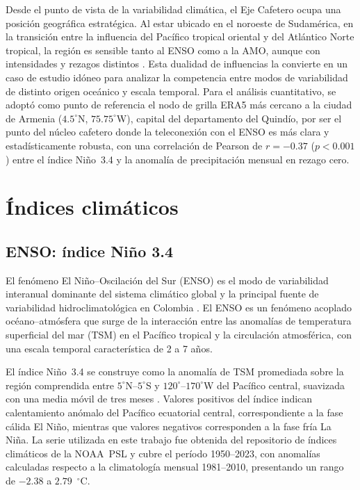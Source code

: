 \documentclass[12pt, a4paper]{article}
\begin{document}
Desde el punto de vista de la variabilidad climática, el Eje Cafetero ocupa una
posición geográfica estratégica. Al estar ubicado en el noroeste de Sudamérica,
en la transición entre la influencia del Pacífico tropical oriental y del Atlántico
Norte tropical, la región es sensible tanto al ENSO como a la AMO, aunque con
intensidades y rezagos distintos \citep{Canchala2020}. Esta dualidad de influencias
la convierte en un caso de estudio idóneo para analizar la competencia entre modos
de variabilidad de distinto origen oceánico y escala temporal. Para el análisis cuantitativo, se adoptó como punto de referencia el nodo de grilla
ERA5 más cercano a la ciudad de Armenia ($4.5^\circ$N, $75.75^\circ$W), capital del
departamento del Quindío, por ser el punto del núcleo cafetero donde la teleconexión
con el ENSO es más clara y estadísticamente robusta, con una correlación de Pearson
de $r = -0.37$ ($p < 0.001$) entre el índice Niño~3.4 y la anomalía de precipitación
mensual en rezago cero.

\section{Índices climáticos}

\subsection{ENSO: índice Niño 3.4}

El fenómeno El Niño--Oscilación del Sur (ENSO) es el modo de variabilidad
interanual dominante del sistema climático global y la principal fuente de
variabilidad hidroclimatológica en Colombia \citep{Poveda1997, Poveda2011}.
El ENSO es un fenómeno acoplado océano--atmósfera que surge de la interacción
entre las anomalías de temperatura superficial del mar (TSM) en el Pacífico
tropical y la circulación atmosférica, con una escala temporal característica
de 2 a 7 años.

El índice Niño~3.4 se construye como la anomalía de TSM promediada sobre la
región comprendida entre $5^\circ$N--$5^\circ$S y $120^\circ$--$170^\circ$W
del Pacífico central, suavizada con una media móvil de tres meses
\citep{CórdobaMachado2015b}. Valores positivos del índice indican calentamiento
anómalo del Pacífico ecuatorial central, correspondiente a la fase cálida El
Niño, mientras que valores negativos corresponden a la fase fría La Niña. La
serie utilizada en este trabajo fue obtenida del repositorio de índices
climáticos de la NOAA~PSL y cubre el período 1950--2023, con anomalías
calculadas respecto a la climatología mensual 1981--2010, presentando un rango
de $-2.38$ a $2.79$~$^\circ$C.
\end{document}
